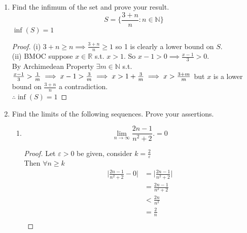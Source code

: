 \documentclass[12pt]{article}
\begin{document}
\begin{enumerate}
\begin{proof}
		      Since $2-x > 0$ by Archimedean Property $\exists m \in \mathbb{N}$ s.t.
		      \begin{align*}
			      2-x > \frac{1}{m}           \\
			      \implies -x > \frac{1}{m}-2 \\
			      \implies x < 2-\frac{1}{m}
		      \end{align*}
		      but $x > 2-\frac{1}{n} \ \forall n \in \mathbb{N}$. $\therefore \bigcap_{n=1}^{\infty}I_n = \emptyset$
	      \end{proof}
	\item Find the infimum of the set and prove your result.
	      \begin{equation*}
		      S = \bigg\{\frac{3+n}{n}:n \in \mathbb{N}\bigg\}
	      \end{equation*}
	      $\inf(S) = 1$
		  \begin{proof}
			  (i) $3+n \geq n \implies \frac{3+n}{n} \geq 1$ so 1 is clearly a lower bound on $S$. \\
			  (ii) BMOC suppose $x \in \mathbb{R}$ s.t. $x > 1$. So $x-1 > 0 \implies \frac{x-1}{3} > 0$. \\
			  By Archimedean Property $\exists m \in \mathbb{N}$ s.t. $\frac{x-1}{3} > \frac{1}{m} \implies x-1 > \frac{3}{m} \implies x > 1+\frac{3}{m} \\
			  \implies x > \frac{3+m}{m}$ but $x$ is a lower bound on $\frac{3+n}{n}$ a contradiction. \\
			  $\therefore \inf(S) = 1$
		  \end{proof}
	\item Find the limits of the following sequences. Prove your assertions.
	      \begin{enumerate}
		      \item \[\lim_{n \to \infty} \frac{2n-1}{n^2+2}. = 0\]
		            \begin{proof}
			            Let $\varepsilon > 0$ be given, consider $k = \frac{2}{\varepsilon}$ \\
			            Then $\forall n \geq k$
			            \begin{align*}
				            \bigg|\frac{2n-1}{n^2+2} - 0\bigg| & = \bigg|\frac{2n-1}{n^2+2}\bigg| \\
				                                               & = \frac{2n-1}{n^2+2}             \\
				                                               & < \frac{2n}{n^2}                 \\
				                                               & = \frac{2}{n}                    \\

\end{align*}
\end{proof}
\end{enumerate}
\end{enumerate}
\end{document}
